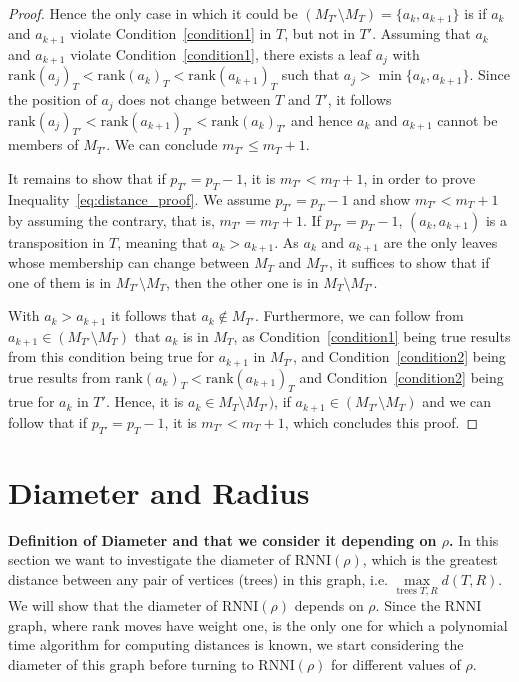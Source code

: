 \documentclass[11pt]{amsart}
\newcommand{\rnni}{\mathrm{RNNI}}
\newcommand{\rank}{\mathrm{rank}}
\newcommand{\summary}[1]{\textbf{#1}} %
\begin{document}
\begin{proof}
	Hence the only case in which it could be $(M_{T'} \setminus M_T) = \{a_k, a_{k+1}\}$ is if $a_k$ and $a_{k+1}$ violate Condition~\ref{condition1} in $T$, but not in $T'$.
	Assuming that $a_k$ and $a_{k+1}$ violate Condition~\ref{condition1}, there exists a leaf $a_j$ with $\rank(a_j)_T < \rank(a_k)_T < \rank(a_{k+1})_T$ such that $a_j > \min\{a_k,a_{k+1}\}$.
	Since the position of $a_j$ does not change between $T$ and $T'$, it follows $\rank(a_j)_{T'} < \rank(a_{k+1})_{T'} < \rank(a_{k})_{T'}$ and hence $a_k$ and $a_{k+1}$ cannot be members of $M_{T'}$.
	We can conclude $m_{T'} \leq m_T + 1$.

	It remains to show that if $p_{T'} = p_T - 1$, it is $m_{T'} < m_T + 1$, in order to prove Inequality~\ref{eq:distance_proof}.
	We assume $p_{T'} = p_T - 1$ and show $m_{T'} < m_T + 1$ by assuming the contrary, that is, $m_{T'} = m_T + 1$.
	If $p_{T'} = p_T - 1$, $(a_k, a_{k+1})$ is a transposition in $T$, meaning that $a_k > a_{k+1}$.
	As $a_k$ and $a_{k+1}$ are the only leaves whose membership can change between $M_T$ and $M_{T'}$, it suffices to show that if one of them is in $M_{T'} \setminus M_T$, then the other one is in $M_T \setminus M_{T'}$.

	With $a_k > a_{k+1}$ it follows that $a_k \notin M_{T'}$.
	Furthermore, we can follow from $a_{k+1} \in (M_{T'} \setminus M_T)$ that $a_k$ is in $M_T$, as Condition~\ref{condition1} being true results from this condition being true for $a_{k+1}$ in $M_{T'}$, and Condition~\ref{condition2} being true results from $\rank(a_k)_T < \rank(a_{k+1})_T$ and Condition~\ref{condition2} being true for $a_k$ in $T'$.
	Hence, it is $a_k \in M_T \setminus M_{T'})$, if $a_{k+1} \in (M_{T'} \setminus M_T)$ and we can follow that if $p_{T'} = p_T - 1$, it is $m_{T'} < m_T + 1$, which concludes this proof.


\end{proof}

\section{Diameter and Radius}

\summary{Definition of Diameter and that we consider it depending on $\rho$.}
In this section we want to investigate the diameter of $\rnni(\rho)$, which is the greatest distance between any pair of vertices (trees) in this graph, i.e. $\max\limits_{\text{trees }T,R}d(T,R)$.
We will show that the diameter of $\rnni(\rho)$ depends on $\rho$.
Since the $\rnni$ graph, where rank moves have weight one, is the only one for which a polynomial time algorithm for computing distances is known, we start considering the diameter of this graph before turning to $\rnni(\rho)$ for different values of $\rho$.
\end{document}

